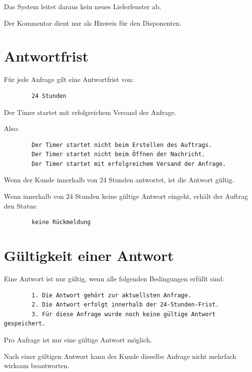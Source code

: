 \documentclass[12pt,a4paper]{article}
\begin{document}
	Das System leitet daraus kein neues Lieferfenster ab.
	
	Der Kommentar dient nur als Hinweis für den Disponenten.
	
	\section{Antwortfrist}
	
	Für jede Anfrage gilt eine Antwortfrist von:
	
	\begin{lstlisting}
		24 Stunden
	\end{lstlisting}
	
	Der Timer startet mit erfolgreichem Versand der Anfrage.
	
	Also:
	
	\begin{lstlisting}
		Der Timer startet nicht beim Erstellen des Auftrags.
		Der Timer startet nicht beim Öffnen der Nachricht.
		Der Timer startet mit erfolgreichem Versand der Anfrage.
	\end{lstlisting}
	
	Wenn der Kunde innerhalb von 24 Stunden antwortet, ist die Antwort gültig.
	
	Wenn innerhalb von 24 Stunden keine gültige Antwort eingeht, erhält der Auftrag den Status:
	
	\begin{lstlisting}
		keine Rückmeldung
	\end{lstlisting}
	
	\section{Gültigkeit einer Antwort}
	
	Eine Antwort ist nur gültig, wenn alle folgenden Bedingungen erfüllt sind:
	
	\begin{lstlisting}
		1. Die Antwort gehört zur aktuellsten Anfrage.
		2. Die Antwort erfolgt innerhalb der 24-Stunden-Frist.
		3. Für diese Anfrage wurde noch keine gültige Antwort gespeichert.
	\end{lstlisting}
	
	Pro Anfrage ist nur eine gültige Antwort möglich.
	
	Nach einer gültigen Antwort kann der Kunde dieselbe Anfrage nicht mehrfach wirksam beantworten.
	
\end{document}
